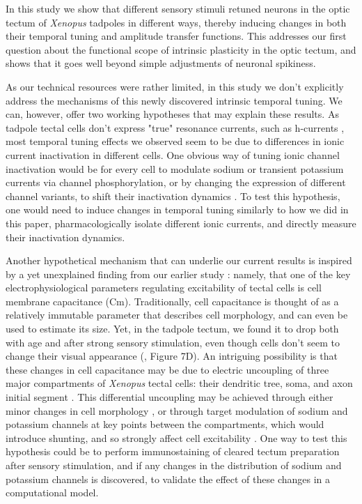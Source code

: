 \documentclass{article}
\begin{document}
In this study we show that different sensory stimuli retuned neurons in the optic tectum of \textit{Xenopus} tadpoles in different ways, thereby inducing changes in both their temporal tuning and amplitude transfer functions. This addresses our first question about the functional scope of intrinsic plasticity in the optic tectum, and shows that it goes well beyond simple adjustments of neuronal spikiness.

As our technical resources were rather limited, in this study we don't explicitly address the mechanisms of this newly discovered intrinsic temporal tuning. We can, however, offer two working hypotheses that may explain these results. As tadpole tectal cells don't express "true" resonance currents, such as h-currents \citep{ciarleglio2015}, most temporal tuning effects we observed seem to be due to differences in ionic current inactivation in different cells. One obvious way of tuning ionic channel inactivation would be for every cell to modulate sodium or transient potassium currents via channel phosphorylation, or by changing the expression of different channel variants, to shift their inactivation dynamics \citep{frank2003nachannels,goldwyn2018a_current}. To test this hypothesis, one would need to induce changes in temporal tuning similarly to how we did in this paper, pharmacologically isolate different ionic currents, and directly measure their inactivation dynamics.

Another hypothetical mechanism that can underlie our current results is inspired by a yet unexplained finding from our earlier study \citep{ciarleglio2015}: namely, that one of the key electrophysiological parameters regulating excitability of tectal cells is cell membrane capacitance (Cm). Traditionally, cell capacitance is thought of as a relatively immutable parameter that describes cell morphology, and can even be used to estimate its size. Yet, in the tadpole tectum, we found it to drop both with age and after strong sensory stimulation, even though cells don't seem to change their visual appearance (\citealt{ciarleglio2015}, Figure 7D). An intriguing possibility is that these changes in cell capacitance may be due to electric uncoupling of three major compartments of \textit{Xenopus} tectal cells: their dendritic tree, soma, and axon initial segment \citep{bollmann2009,jarvis2018morphology}. This differential uncoupling may be achieved through either minor changes in cell morphology \citep{leterrier2018axon}, or through target modulation of sodium and potassium channels at key points between the compartments, which would introduce shunting, and so strongly affect cell excitability \citep{grubb2010activity,kuba2010initial}. One way to test this hypothesis could be to perform immunostaining of cleared tectum preparation after sensory stimulation, and if any changes in the distribution of sodium and potassium channels is discovered, to validate the effect of these changes in a computational model.
\end{document}
